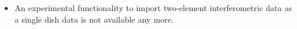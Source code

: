 \begin{itemize}
\item An experimental functionality to import two-element interferometric 
data as a single dish data is not available any more.
\end{itemize}
%
%
%
